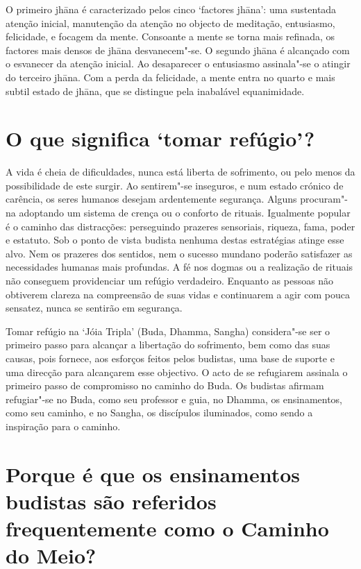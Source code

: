 O primeiro jhāna é caracterizado pelos cinco `factores jhāna': uma
sustentada atenção inicial, manutenção da atenção no objecto de
meditação, entusiasmo, felicidade, e focagem da mente. Consoante a mente
se torna mais refinada, os factores mais densos de jhāna desvanecem"-se.
O segundo jhāna é alcançado com o esvanecer da atenção inicial. Ao
desaparecer o entusiasmo assinala"-se o atingir do terceiro jhāna. Com a
perda da felicidade, a mente entra no quarto e mais subtil estado de
jhāna, que se distingue pela inabalável equanimidade.

\section{O que significa `tomar refúgio'?}

A vida é cheia de dificuldades, nunca está liberta de sofrimento, ou
pelo menos da possibilidade de este surgir. Ao sentirem"-se inseguros, e
num estado crónico de carência, os seres humanos desejam ardentemente
segurança. Alguns procuram"-na adoptando um sistema de crença ou o
conforto de rituais. Igualmente popular é o caminho das distracções:
perseguindo prazeres sensoriais, riqueza, fama, poder e estatuto. Sob o
ponto de vista budista nenhuma destas estratégias atinge esse alvo. Nem
os prazeres dos sentidos, nem o sucesso mundano poderão satisfazer as
necessidades humanas mais profundas. A fé nos dogmas ou a realização de
rituais não conseguem providenciar um refúgio verdadeiro. Enquanto as
pessoas não obtiverem clareza na compreensão de suas vidas e continuarem
a agir com pouca sensatez, nunca se sentirão em segurança.

Tomar refúgio na `Jóia Tripla' (Buda, Dhamma, Sangha) considera"-se
ser o primeiro passo para alcançar a libertação do sofrimento, bem como
das suas causas, pois fornece, aos esforços feitos pelos budistas, uma
base de suporte e uma direcção para alcançarem esse objectivo. O acto de
se refugiarem assinala o primeiro passo de compromisso no caminho do
Buda. Os budistas afirmam refugiar"-se no Buda, como seu professor e
guia, no Dhamma, os ensinamentos, como seu caminho, e no Sangha, os
discípulos iluminados, como sendo a inspiração para o caminho.

\section{Porque é que os ensinamentos budistas são referidos frequentemente como
  o Caminho do Meio?}

